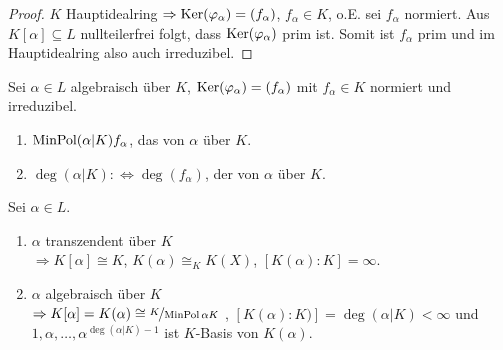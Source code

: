 \begin{proof}
	$K$ Hauptidealring $\Rightarrow \operatorname{Ker}(\varphi_\alpha) = (f_\alpha)$, $f_\alpha \in K$, o.E. sei $f_{\alpha}$ normiert. Aus $K[\alpha] \subseteq L$ nullteilerfrei folgt, dass $\operatorname{Ker}(\varphi_\alpha)$ prim ist. Somit ist $f_\alpha$ prim und im Hauptidealring also auch irreduzibel.
\end{proof}

\begin{definition}
	Sei $\alpha \in L$ algebraisch über $K$, $\operatorname{Ker}(\varphi_\alpha) = (f_\alpha)$ mit $f_\alpha \in K$ normiert und irreduzibel.
	\begin{enumerate}
		\item $\operatorname{MinPol}(\alpha\vert K)  f_\alpha$, das  von $\alpha$ über $K$.
		\item $\deg(\alpha\vert K) :\Leftrightarrow \deg(f_\alpha)$, der  von $\alpha$ über $K$.
	\end{enumerate}
\end{definition}

\begin{proposition}
	Sei $\alpha \in L$.
	\begin{enumerate}
		\item $\alpha$ transzendent über $K$ \\
		$\Rightarrow K[\alpha] \cong K$, $K(\alpha) \cong_K K(X)$, $[K(\alpha) : K] = \infty$.
		\item $\alpha$ algebraisch über $K$ \\
		$\Rightarrow K[\alpha] = K(\alpha) \cong \lnkset{K}{\MinPol{\alpha}{K}}$ , $[ K(\alpha) \colon K)]  = \deg(\alpha \vert K) < \infty$ und \\
		$1, \alpha, \dots , \alpha^{\deg(\alpha \vert K) -1}$ ist $K$-Basis von $K(\alpha)$. 
	\end{enumerate}
\end{proposition}

